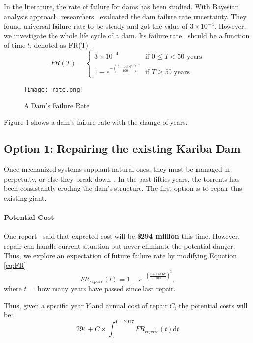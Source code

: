 \documentclass{mcmthesis}
\begin{document}
In the literature, the rate of failure for dams has been studied. With Bayesian analysis approach, researchers~\cite{Failure} evaluated the dam failure rate uncertainty. They found universal failure rate to be steady and got the value of $3\times 10^{-4}$. However, we investigate the whole life cycle of a dam. Its failure rate~\cite{Wiki_bathtub} should be a function of time $t$, denoted as FR(T)
\begin{equation}
\label{eq:FR}
FR(T) = \left\{ \begin{array}{ll}
3\times 10^{-4} & \textrm{if $0\leq T<50$ years}\\
1-e^{-(\frac{t+143.67}{100})^3} & \textrm{if $T\geq 50$ years}
\end{array} \right.
\end{equation}

\begin{figure}[h]
    \centering
    \texttt{[image: rate.png]}
    \caption{A Dam's Failure Rate }
    \label{fig:rate}
\end{figure}
Figure \ref{fig:rate} shows a dam's failure rate with the change of years.

\subsection*{Option 1: Repairing the existing Kariba Dam}
Once mechanized systems supplant natural ones, they must be managed in perpetuity, or else they break down~\cite{New_Dam}. In the past fifties years, the torrents has been consistantly eroding the dam's structure. The first option is to repair this existing giant.
\paragraph{Potential Cost}
One report~\cite{Reu_Dam} said that expected cost will be \textbf{\$294 million} this time. However, repair can handle current situation but never eliminate the potential danger. Thus, we explore an expectation of future failure rate by modifying Equation \eqref{eq:FR}
\begin{equation}
\label{eq:FR2}
FR_{repair}(t)  = 1-e^{-(\frac{t+143.67}{100})^3},
\end{equation}
where $t =$ how many years have passed since last repair.

Thus, given a specific year $Y$ and annual cost of repair $C$, the potential costs will be:
\begin{equation}
\label{eq:FR3}
294+C\times\int_0^{Y-2017} FR_{repair}(t)\mathrm{d}t
\end{equation}
\end{document}
